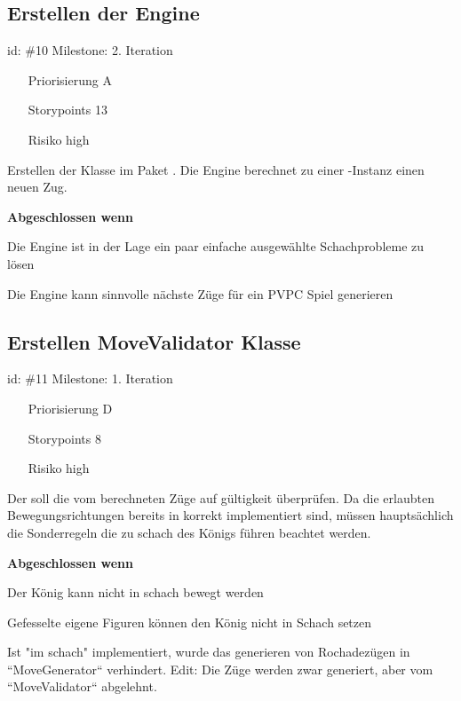 \subsection*{Erstellen der Engine}
id: \#10 Milestone: 2. Iteration\\

\begin{itemize}
\item[Priorisierung] A
\item[Storypoints] 13
\item[Risiko] high
\end{itemize}

Erstellen der Klasse  im Paket . Die Engine berechnet zu einer -Instanz einen neuen Zug.

\textbf{Abgeschlossen wenn}
\begin{todolist}
    \item[\done]  Die Engine ist in der Lage ein paar einfache ausgewählte Schachprobleme zu lösen
  \item[\done]  Die Engine kann sinnvolle nächste Züge für ein PVPC Spiel generieren

\end{todolist}


\subsection*{Erstellen MoveValidator Klasse}
id: \#11 Milestone: 1. Iteration\\

\begin{itemize}
\item[Priorisierung] D
\item[Storypoints] 8
\item[Risiko] high
\end{itemize}

Der  soll die vom  berechneten Züge auf gültigkeit überprüfen. Da die erlaubten Bewegungsrichtungen bereits in  korrekt implementiert sind, müssen hauptsächlich die Sonderregeln die zu schach des Königs führen beachtet werden. 

\textbf{Abgeschlossen wenn}
\begin{todolist}
    \item[\done]  Der König kann nicht in schach bewegt werden
  \item[\done]  Gefesselte eigene Figuren können den König nicht in Schach setzen
  \item[\done]  Ist "im schach" implementiert, wurde das generieren von Rochadezügen in ``MoveGenerator`` verhindert. Edit: Die Züge werden zwar generiert, aber vom ``MoveValidator`` abgelehnt.

\end{todolist}


